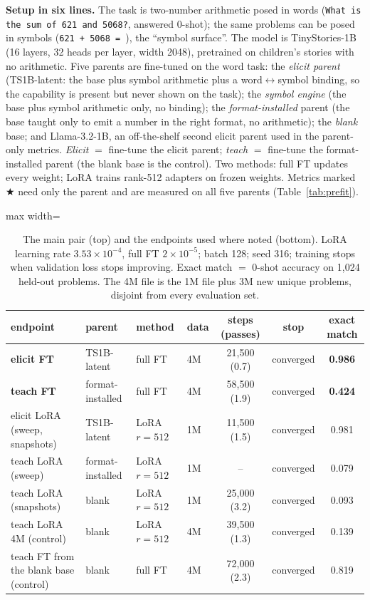 \documentclass[11pt]{article}
\begin{document}
\noindent\textbf{Setup in six lines.} The task is two-number arithmetic posed in words
(\texttt{What is the sum of 621 and 5068?}, answered 0-shot); the same problems can be posed in
symbols (\texttt{621 + 5068 = }), the ``symbol surface''. The model is TinyStories-1B (16
layers, 32 heads per layer, width 2048), pretrained on children's stories with no arithmetic.
Five parents are fine-tuned on the word task: the \emph{elicit parent} (TS1B-latent: the base
plus symbol arithmetic plus a word$\leftrightarrow$symbol binding, so the capability is present
but never shown on the task); the \emph{symbol engine} (the base plus symbol arithmetic only, no
binding); the \emph{format-installed} parent (the base taught only to emit a number in the right
format, no arithmetic); the \emph{blank} base; and Llama-3.2-1B, an off-the-shelf second elicit
parent used in the parent-only metrics. \emph{Elicit} $=$ fine-tune the elicit parent;
\emph{teach} $=$ fine-tune the format-installed parent (the blank base is the control). Two
methods: full FT updates every weight; LoRA trains rank-512 adapters on frozen weights. Metrics
marked $\bigstar$ need only the parent and are measured on all five parents (Table~\ref{tab:prefit}).

\begin{table}[h]\centering\small
\begin{adjustbox}{max width=\textwidth}
\begin{tabular}{llllccc}
\toprule
endpoint & parent & method & data & steps (passes) & stop & exact match \\
\midrule
\textbf{elicit FT} & TS1B-latent & full FT & 4M & 21{,}500 (0.7) & converged & \textbf{0.986} \\
\textbf{teach FT} & format-installed & full FT & 4M & 58{,}500 (1.9) & converged & \textbf{0.424} \\
\midrule
elicit LoRA (sweep, snapshots) & TS1B-latent & LoRA $r{=}512$ & 1M & 11{,}500 (1.5) & converged & 0.981 \\
teach LoRA (sweep) & format-installed & LoRA $r{=}512$ & 1M & -- & converged & 0.079 \\
teach LoRA (snapshots) & blank & LoRA $r{=}512$ & 1M & 25{,}000 (3.2) & converged & 0.093 \\
teach LoRA 4M (control) & blank & LoRA $r{=}512$ & 4M & 39{,}500 (1.3) & converged & 0.139 \\
teach FT from the blank base (control) & blank & full FT & 4M & 72{,}000 (2.3) & converged & 0.819 \\
\bottomrule
\end{tabular}
\end{adjustbox}
\caption{The main pair (top) and the endpoints used where noted (bottom). LoRA learning rate
$3.53{\times}10^{-4}$, full FT $2{\times}10^{-5}$; batch 128; seed 316; training stops when
validation loss stops improving. Exact match $=$ 0-shot accuracy on 1,024 held-out
problems. The 4M file is the 1M file plus 3M new unique problems, disjoint from every evaluation
set.}
\label{tab:endpoints}
\end{table}
\end{document}
